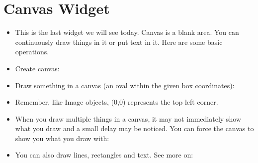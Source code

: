 \documentclass[letterpaper,10pt,english]{sphinxmanual}
\begin{document}
\section{Canvas Widget}
\label{\detokenize{lecture_notes/lec22_tkinter:canvas-widget}}\begin{itemize}
\item {} 
This is the last widget we will see today. Canvas is a blank area. You can continuously
draw things in it or put text in it. Here are some basic operations.

\item {} 
Create canvas:

%
\begin{sphinxVerbatim}[commandchars=\\\{\}]
    
\end{sphinxVerbatim}

\item {} 
Draw something in a canvas (an oval within the given box coordinates):

%
\begin{sphinxVerbatim}[commandchars=\\\{\}]
\end{sphinxVerbatim}

\item {} 
Remember, like Image objects, (0,0) represents the top left corner.

\item {} 
When you draw multiple things in a canvas, it may not immediately
show what you draw and a small delay may be noticed. You can force
the canvas to show you what you draw with:

%
\begin{sphinxVerbatim}[commandchars=\\\{\}]
\end{sphinxVerbatim}

\item {} 
You can also draw lines, rectangles and text. See more on:


\end{itemize}
\end{document}

